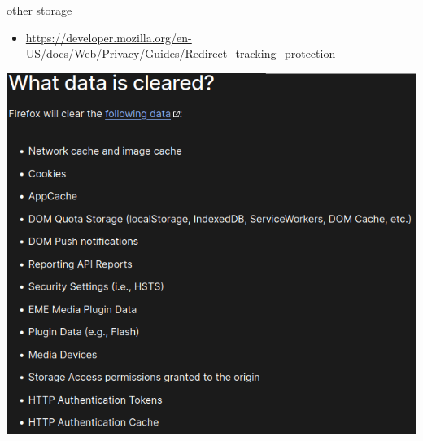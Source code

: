 \begin{frame}{other storage}
\begin{itemize}
\item {\scriptsize\url{https://developer.mozilla.org/en-US/docs/Web/Privacy/Guides/Redirect_tracking_protection}}
\end{itemize}
\includegraphics[height=0.8\textheight]{../web/ff-redirect-clears}
\end{frame}

